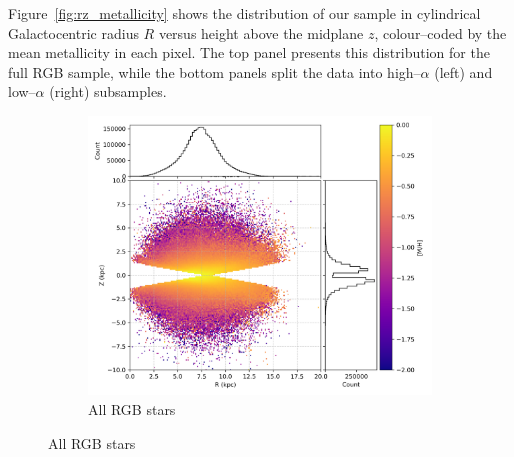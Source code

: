 \documentclass[a4paper,12pt]{article}
\begin{document}
Figure~\ref{fig:rz_metallicity} shows the distribution of our sample in cylindrical Galactocentric radius 
$R$ versus height above the midplane $z$, colour–coded by the mean metallicity in each pixel. The top panel 
presents this distribution for the full RGB sample, while the bottom panels split the data into high–$\alpha$ 
(left) and low–$\alpha$ (right) subsamples. 

\begin{figure}[H]
  \centering
  \begin{subfigure}{0.6\textwidth}
    \centering
    \includegraphics[width=\textwidth]{../figures/vis_rz_metallicity_all.png}
    \caption{All RGB stars}
    \label{fig:rz_all}
  \end{subfigure}

  \vspace{0.8em}


\end{figure}
\end{document}
